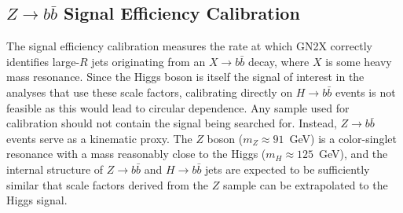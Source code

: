 \subsection{\texorpdfstring{$Z \rightarrow b\bar{b}$}{Z->bb} Signal Efficiency Calibration}

The signal efficiency calibration measures the rate at which GN2X correctly identifies large-$R$ jets originating from an $X \rightarrow b\bar{b}$ decay, where $X$ is some heavy mass resonance. 
Since the Higgs boson is itself the signal of interest in the analyses that use these scale factors, calibrating directly on $H \rightarrow b\bar{b}$ events is not feasible as this would lead to circular dependence. 
Any sample used for calibration should not contain the signal being searched for. 
Instead, $Z \rightarrow b\bar{b}$ events serve as a kinematic proxy. 
The $Z$ boson ($m_Z \approx 91$~GeV) is a color-singlet resonance with a mass reasonably close to the Higgs ($m_H \approx 125$~GeV), and the internal structure of $Z \rightarrow b\bar{b}$ and $H \rightarrow b\bar{b}$ jets are expected to be sufficiently similar that scale factors derived from the $Z$ sample can be extrapolated to the Higgs signal.

